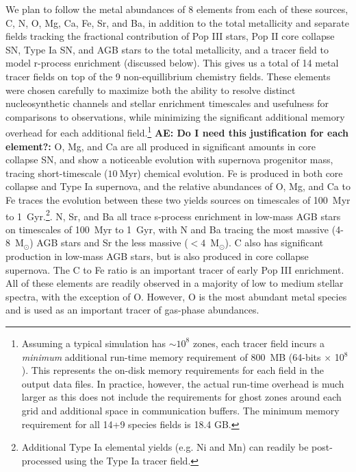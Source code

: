 \documentclass[12pt]{article} %
\begin{document}
We plan to follow the metal abundances of 8 elements from each of these sources, C, N, O, Mg, Ca, Fe, Sr, and Ba, in addition to the total metallicity and separate fields tracking the fractional contribution of Pop III stars, Pop II core collapse SN, Type Ia SN, and AGB stars to the total metallicity, and a tracer field to model r-process enrichment (discussed below). This gives us a total of 14 metal tracer fields on top of the 9 non-equillibrium chemistry fields. These elements were chosen carefully to maximize both the ability to resolve distinct nucleosynthetic channels and stellar enrichment timescales and usefulness for comparisons to observations, while minimizing the significant additional memory overhead for each additional field.\footnote{Assuming a typical simulation has $\sim10^8$ zones, each tracer field incurs a \textit{minimum} additional run-time memory requirement of 800~MB  (64-bits $\times$ 10$^8$). This represents the on-disk memory requirements for each field in the output data files. In practice, however, the actual run-time overhead is much larger as this does not include the requirements for ghost zones around each grid and additional space in communication buffers. The minimum memory requirement for all 14+9 species fields is 18.4 GB.} \textbf{AE: Do I need this justification for each element?:} O, Mg, and Ca are all produced in significant amounts in core collapse SN, and show a noticeable evolution with supernova progenitor mass, tracing short-timescale ($10~$Myr) chemical evolution. Fe is produced in both core collapse and Type Ia supernova, and the relative abundances of O, Mg, and Ca to Fe traces the evolution between these two yields sources on timescales of 100~Myr to 1~Gyr.\footnote{Additional Type Ia elemental yields (e.g. Ni and Mn) can readily be post-processed using the Type Ia tracer field.}. N, Sr, and Ba all trace s-process enrichment in low-mass AGB stars on timescales of 100~Myr to 1~Gyr, with N and Ba tracing the most massive (4-8~M$_{\odot}$) AGB stars and Sr the less massive ($<4$~M$_{\odot}$). C also has significant production in low-mass AGB stars, but is also produced in core collapse supernova. The C to Fe ratio is an important tracer of early Pop III enrichment. All of these elements are readily observed in a majority of low to medium stellar spectra, with the exception of O. However, O is the most abundant metal species and is used as an important tracer of gas-phase abundances.
\end{document}
